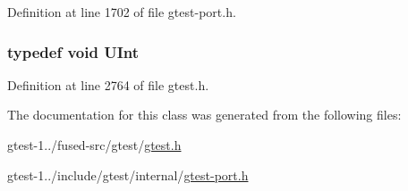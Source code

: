 \-Definition at line 1702 of file gtest-\/port.\-h.

\hypertarget{classtesting_1_1internal_1_1TypeWithSize_adfade8609e616ed641c69c10c34622fc}{
\subsubsection[{\-U\-Int}]{\setlength{\rightskip}{0pt plus 5cm}typedef void {\bf \-U\-Int}}}\label{db/dae/classtesting_1_1internal_1_1TypeWithSize_adfade8609e616ed641c69c10c34622fc}


\-Definition at line 2764 of file gtest.\-h.



\-The documentation for this class was generated from the following files\-:\begin{DoxyCompactItemize}
\item 
gtest-\/1../fused-\/src/gtest/\hyperlink{fused-src_2gtest_2gtest_8h}{gtest.\-h}\item 
gtest-\/1../include/gtest/internal/\hyperlink{gtest-port_8h}{gtest-\/port.\-h}\end{DoxyCompactItemize}
